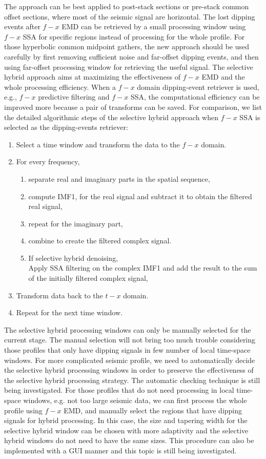  The approach can be best applied to post-stack sections or pre-stack common offset sections, where most of the seismic signal are horizontal. The lost dipping events after $f-x$ EMD can be retrieved by a small processing window using $f-x$ SSA for specific regions instead of processing for the whole profile. For those hyperbolic common midpoint gathers, the new approach should be used carefully by first removing sufficient noise and far-offset dipping events, and then using far-offset processing window for retrieving the useful signal. The selective hybrid approach aims at maximizing the effectiveness of $f-x$ EMD and the whole processing efficiency. When a $f-x$ domain dipping-event retriever is used, e.g., $f-x$ predictive filtering and $f-x$ SSA, the computational efficiency can be improved more because a pair of transforms can be saved. For comparison, we list the detailed algorithmic steps of the selective hybrid approach when $f-x$ SSA is selected as the dipping-events retriever:
\begin{enumerate}
\item 
Select a time window and transform the data to the $f-x$ domain.
\item 
For every frequency, 
\begin{enumerate}
\item
separate real and imaginary parts in the spatial sequence,
\item
compute IMF1, for the real signal and subtract it to obtain the filtered real signal,
\item
repeat for the imaginary part,
\item
combine to create the filtered complex signal.
\item 
If selective hybrid denoising, \\
Apply SSA filtering on the complex IMF1 and add the result to the sum of the initially filtered complex signal,
\end{enumerate}
\item
Transform data back to the $t-x$ domain.
\item
Repeat for the next time window.
\end{enumerate}

The selective hybrid processing windows can only be manually selected for the current stage. The manual selection will not bring too much trouble considering those profiles that only have dipping signals in few number of local time-space windows. For more complicated seismic profile, we need to automatically decide the selective hybrid processing windows in order to preserve the effectiveness of the selective hybrid processing strategy. The automatic checking technique is still being investigated.   
For those profiles that do not need processing in local time-space windows, e.g. not too large seismic data, we can first process the whole profile using $f-x$ EMD, and manually select the regions that have dipping signals for hybrid processing. In this case, the size and tapering width for the selective hybrid window can be chosen with more adaptivity and the selective hybrid windows do not need to have the same sizes. This procedure can also be implemented with a GUI manner and this topic is still being investigated.

